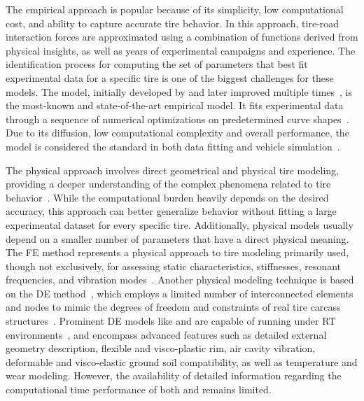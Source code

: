 The empirical approach is popular because of its simplicity, low computational cost, and ability to capture accurate tire behavior. In this approach, tire-road interaction forces are approximated using a combination of functions derived from physical insights, as well as years of experimental campaigns and experience. The identification process for computing the set of parameters that best fit experimental data for a specific tire is one of the biggest challenges for these models. The \MagicFormulae{} model, initially developed by \citet{bakker1987tyre} and later improved multiple times~\cite{pacejka2012tire}, is the most-known and state-of-the-art empirical model. It fits experimental data through a sequence of numerical optimizations on predetermined curve shapes~\cite{bayle1993new}. Due to its diffusion, low computational complexity and overall performance, the \MagicFormulae{} model is considered the standard in both data fitting and vehicle simulation~\cite{guiggiani2014science, pacejka2012tire}.

The physical approach involves direct geometrical and physical tire modeling, providing a deeper understanding of the complex phenomena related to tire behavior~\cite{nakajima2019advanced}. While the computational burden heavily depends on the desired accuracy, this approach can better generalize behavior without fitting a large experimental dataset for every specific tire. Additionally, physical models usually depend on a smaller number of parameters that have a direct physical meaning. The \ac{FE} method represents a physical approach to tire modeling primarily used, though not exclusively, for assessing static characteristics, stiffnesses, resonant frequencies, and vibration modes~\cite{taheri2014technical}. Another physical modeling technique is based on the \ac{DE} method~\cite{karpman2020discrete}, which employs a limited number of interconnected elements and nodes to mimic the degrees of freedom and constraints of real tire carcass structures~\cite{gipser2005ftire, gallrein2007cdtire, yamashita2016physicsbased}. Prominent \ac{DE} models like \FTire{} and \CDTire{} are capable of running under \ac{RT} environments~\cite{cosinscientific, gallrein2014advanced}, and encompass advanced features such as detailed external geometry description, flexible and visco-plastic rim, air cavity vibration, deformable and visco-elastic ground soil compatibility, as well as temperature and wear modeling. However, the availability of detailed information regarding the computational time performance of both \FTire{} and \CDTire{} remains limited.

